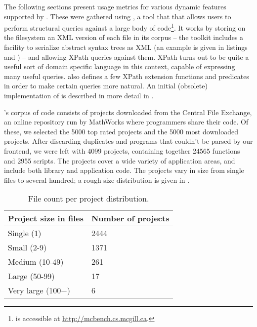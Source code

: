 The following sections present usage metrics for various dynamic features
supported by \matlab. These were gathered using \mcbench, a tool that that
allows users to perform structural queries against a large body of \matlab
code\footnote{\mcbench is accessible at \url{http://mcbench.cs.mcgill.ca}.}. It
works by storing on the filesystem an XML version of each \matlab file in its
corpus -- the \mclab toolkit includes a facility to serialize \matlab abstract
syntax trees as XML (an example is given in listings 
and ) -- and allowing XPath queries against them. XPath
turns out to be quite a useful sort of domain specific language in this
context, capable of expressing many useful queries. \mcbench also defines a few
XPath extension functions and predicates in order to make certain queries more
natural. An initial (obsolete) implementation of \mcbench is described in more
detail in \cite{SoroushThesis}.





\mcbench's corpus of \matlab code consists of projects downloaded from the
\matlab Central File Exchange, an online repository run by MathWorks where
\matlab programmers share their code. Of these, we selected the 5000 top rated
projects and the 5000 most downloaded projects. After discarding duplicates and
programs that couldn't be parsed by our \matlab frontend, we were left with
4099 projects, containing together 24565 functions and 2955 scripts. The
projects cover a wide variety of application areas, and include both library
and application code. The projects vary in size from single files to several
hundred; a rough size distribution is given in .

\begin{table}
\centering
\begin{tabular}{| l | l |}
\hline
Project size in files & Number of projects \\ \hline
Single (1) & 2444 \\ \hline
Small (2-9) & 1371 \\ \hline
Medium (10-49) & 261 \\ \hline
Large (50-99) & 17 \\ \hline
Very large (100+) & 6 \\ \hline
\end{tabular}
\caption{File count per project distribution.}
\label{tab:1}
\end{table}

